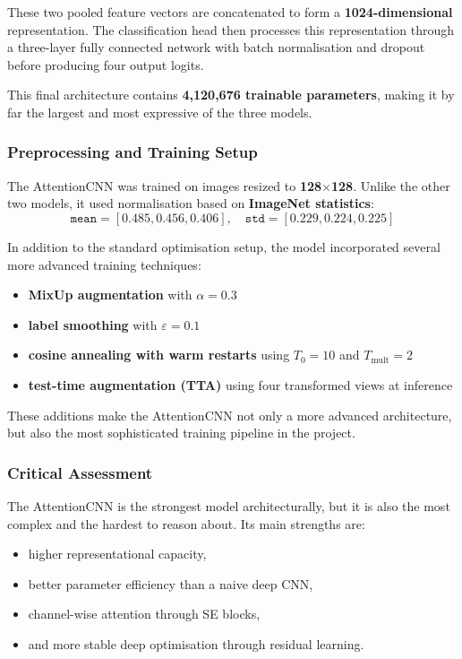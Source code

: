 \documentclass{article}
\begin{document}
These two pooled feature vectors are concatenated to form a \textbf{1024-dimensional} representation. The classification head then processes this representation through a three-layer fully connected network with batch normalisation and dropout before producing four output logits.

This final architecture contains \textbf{4,120,676 trainable parameters}, making it by far the largest and most expressive of the three models.

\subsubsection{Preprocessing and Training Setup}

The AttentionCNN was trained on images resized to \textbf{128$\times$128}. Unlike the other two models, it used normalisation based on \textbf{ImageNet statistics}:
\[\texttt{mean} = [0.485, 0.456, 0.406], \quad
\texttt{std} = [0.229, 0.224, 0.225]\]

In addition to the standard optimisation setup, the model incorporated several more advanced training techniques:
\begin{itemize}
    \item \textbf{MixUp augmentation} with $\alpha=0.3$
    \item \textbf{label smoothing} with $\varepsilon=0.1$
    \item \textbf{cosine annealing with warm restarts} using $T_0=10$ and $T_{\text{mult}}=2$
    \item \textbf{test-time augmentation (TTA)} using four transformed views at inference
\end{itemize}

These additions make the AttentionCNN not only a more advanced architecture, but also the most sophisticated training pipeline in the project.

\subsubsection{Critical Assessment}

The AttentionCNN is the strongest model architecturally, but it is also the most complex and the hardest to reason about. Its main strengths are:
\begin{itemize}
    \item higher representational capacity,
    \item better parameter efficiency than a naive deep CNN,
    \item channel-wise attention through SE blocks,
    \item and more stable deep optimisation through residual learning.
\end{itemize}
\end{document}
